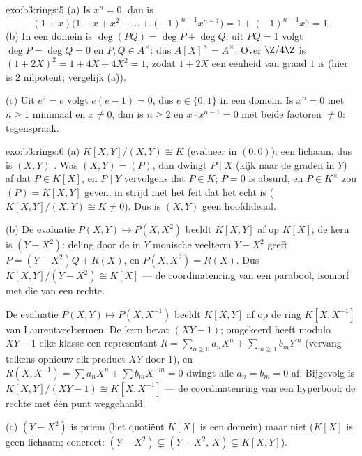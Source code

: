 \begin{solution}{exo:b3:rings:5}
(a) Is $x^n = 0$, dan is
\[
(1 + x)\bigl(1 - x + x^2 - \dots + (-1)^{n-1}x^{n-1}\bigr)
= 1 + (-1)^{n-1}x^n = 1 .
\]
(b) In een domein is $\deg(PQ) = \deg P + \deg Q$; uit $PQ = 1$
volgt $\deg P = \deg Q = 0$ en $P, Q \in A^\times$: dus
$A[X]^\times = A^\times$. Over $\Z/4\Z$ is $(1 + 2X)^2 = 1 + 4X +
4X^2 = 1$, zodat $1 + 2X$ een eenheid van graad $1$ is (hier is $2$
nilpotent; vergelijk (a)).

(c) Uit $e^2 = e$ volgt $e(e - 1) = 0$, dus $e \in \{0, 1\}$ in een
domein. Is $x^n = 0$ met $n \geq 1$ minimaal en $x \ne 0$, dan is
$n \geq 2$ en $x \cdot x^{n-1} = 0$ met beide factoren $\neq 0$:
tegenspraak.
\end{solution}

\begin{solution}{exo:b3:rings:6}
(a) $K[X,Y]/(X,Y) \cong K$ (evalueer in $(0,0)$): een lichaam, dus
is $(X,Y)$ . Was $(X, Y) = (P)$, dan dwingt $P \mid X$ (kijk
naar de graden in $Y$) af dat $P \in K[X]$, en $P \mid Y$
vervolgens dat $P \in K$; $P = 0$ is absurd, en $P \in K^\times$
zou $(P) = K[X,Y]$ geven, in strijd met het feit dat het 
echt is ($K[X,Y]/(X,Y) \cong K \neq 0$). Dus is $(X,Y)$ geen
hoofdideaal.

(b) De evaluatie $P(X, Y) \mapsto P(X, X^2)$ beeldt $K[X,Y]$ af op
$K[X]$; de kern is $(Y - X^2)$: deling door de in $Y$ monische
veelterm $Y - X^2$ geeft $P = (Y - X^2)Q + R(X)$, en $P(X, X^2) =
R(X)$. Dus $K[X,Y]/(Y - X^2) \cong K[X]$ --- de coördinatenring van
een parabool, isomorf met die van een rechte.

De evaluatie $P(X, Y) \mapsto P(X, X^{-1})$ beeldt $K[X, Y]$ af op
de ring $K[X, X^{-1}]$ van Laurentveeltermen. De kern bevat $(XY -
1)$; omgekeerd heeft modulo $XY - 1$ elke klasse een representant
$R = \sum_{n \geq 0} a_nX^n + \sum_{m \geq 1} b_m Y^m$ (vervang
telkens opnieuw elk product $XY$ door $1$), en $R(X, X^{-1}) = \sum
a_n X^n + \sum b_m X^{-m} = 0$ dwingt alle $a_n = b_m = 0$ af.
Bijgevolg is $K[X, Y]/(XY - 1) \cong K[X, X^{-1}]$ --- de
coördinatenring van een hyperbool: de rechte met één punt
weggehaald.

(c) $(Y - X^2)$ is priem (het quotiënt $K[X]$ is een domein) maar
niet  ($K[X]$ is geen lichaam; concreet: $(Y - X^2)
\subsetneq (Y - X^2,\, X) \subsetneq K[X,Y]$).
\end{solution}

